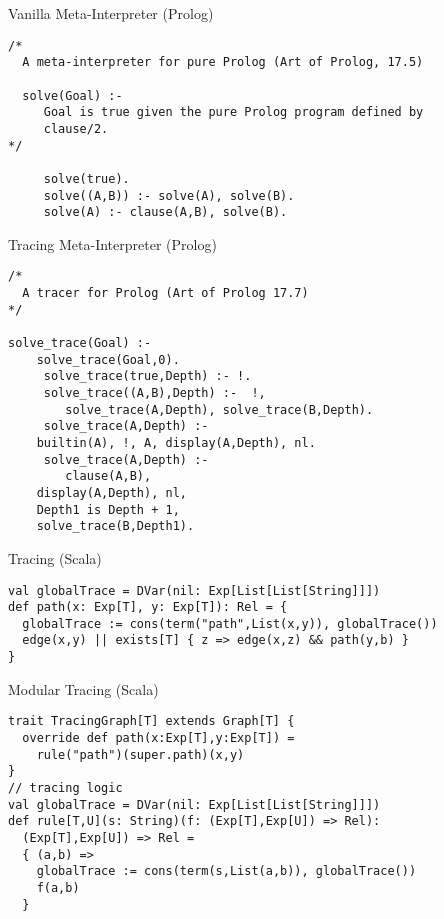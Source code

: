 \documentclass{beamer}
\begin{document}
\begin{frame}[fragile]{Vanilla Meta-Interpreter (Prolog)}
\begin{verbatim}
/*
  A meta-interpreter for pure Prolog (Art of Prolog, 17.5)

  solve(Goal) :-
     Goal is true given the pure Prolog program defined by
     clause/2.
*/

     solve(true).
     solve((A,B)) :- solve(A), solve(B).
     solve(A) :- clause(A,B), solve(B).
\end{verbatim}
\end{frame}

\begin{frame}[fragile]{Tracing Meta-Interpreter (Prolog)}
\begin{verbatim}
/*  
  A tracer for Prolog (Art of Prolog 17.7)
*/
		 
solve_trace(Goal) :-
	solve_trace(Goal,0).
     solve_trace(true,Depth) :- !.
     solve_trace((A,B),Depth) :-  !,
        solve_trace(A,Depth), solve_trace(B,Depth). 
     solve_trace(A,Depth) :-  
	builtin(A), !, A, display(A,Depth), nl.
     solve_trace(A,Depth) :-
        clause(A,B), 
	display(A,Depth), nl,
	Depth1 is Depth + 1, 
	solve_trace(B,Depth1).
\end{verbatim}
\end{frame}

\begin{frame}[fragile]{Tracing (Scala)}
\begin{verbatim}
val globalTrace = DVar(nil: Exp[List[List[String]]])
def path(x: Exp[T], y: Exp[T]): Rel = {
  globalTrace := cons(term("path",List(x,y)), globalTrace())
  edge(x,y) || exists[T] { z => edge(x,z) && path(y,b) }
}
\end{verbatim}
\end{frame}

\begin{frame}[fragile]{Modular Tracing (Scala)}
\begin{verbatim}
trait TracingGraph[T] extends Graph[T] {
  override def path(x:Exp[T],y:Exp[T]) =
    rule("path")(super.path)(x,y)
}
// tracing logic
val globalTrace = DVar(nil: Exp[List[List[String]]])
def rule[T,U](s: String)(f: (Exp[T],Exp[U]) => Rel):
  (Exp[T],Exp[U]) => Rel =
  { (a,b) =>
    globalTrace := cons(term(s,List(a,b)), globalTrace())
    f(a,b)
  }
\end{verbatim}
\end{frame}
\end{document}
